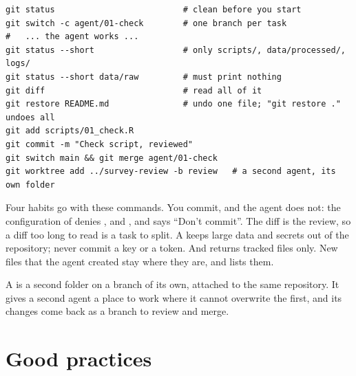 \documentclass[11pt,a4paper]{article}
\begin{document}
\begin{lstlisting}[style=shell,caption={Git around an agent session}]
git status                          # clean before you start
git switch -c agent/01-check        # one branch per task
#   ... the agent works ...
git status --short                  # only scripts/, data/processed/, logs/
git status --short data/raw         # must print nothing
git diff                            # read all of it
git restore README.md               # undo one file; "git restore ." undoes all
git add scripts/01_check.R
git commit -m "Check script, reviewed"
git switch main && git merge agent/01-check
git worktree add ../survey-review -b review   # a second agent, its own folder
\end{lstlisting}

Four habits go with these commands. You commit, and the agent does not: the
configuration of  denies ,  and , and  says ``Don't commit''.
The diff is the review, so a diff too long to read is a task to split. A
 keeps large data and secrets out of the repository; never
commit a key or a token. And  returns tracked files only.
New files that the agent created stay where they are, and 
lists them.

A  is a second folder on a branch of its own, attached to the
same repository. It gives a second agent a place to work where it cannot
overwrite the first, and its changes come back as a branch to review and
merge.

\section*{Good practices}
\end{document}
